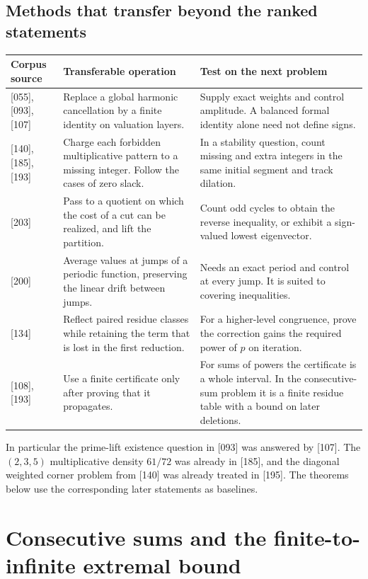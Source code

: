 \documentclass[11pt]{article}
\begin{document}
\subsection*{Methods that transfer beyond the ranked statements}
\begin{tabularx}{\linewidth}{@{}p{.23\linewidth} X X@{}}
\toprule
Corpus source & Transferable operation & Test on the next problem\\\midrule
{[055], [093], [107]} & Replace a global harmonic cancellation by a finite identity on valuation layers. & Supply exact weights and control amplitude. A balanced formal identity alone need not define signs.\\
{[140], [185], [193]} & Charge each forbidden multiplicative pattern to a missing integer. Follow the cases of zero slack. & In a stability question, count missing and extra integers in the same initial segment and track dilation.\\
{[203]} & Pass to a quotient on which the cost of a cut can be realized, and lift the partition. & Count odd cycles to obtain the reverse inequality, or exhibit a sign-valued lowest eigenvector.\\
{[200]} & Average values at jumps of a periodic function, preserving the linear drift between jumps. & Needs an exact period and control at every jump. It is suited to covering inequalities.\\
{[134]} & Reflect paired residue classes while retaining the term that is lost in the first reduction. & For a higher-level congruence, prove the correction gains the required power of $p$ on iteration.\\
{[108], [193]} & Use a finite certificate only after proving that it propagates. & For sums of powers the certificate is a whole interval. In the consecutive-sum problem it is a finite residue table with a bound on later deletions.\\
\bottomrule
\end{tabularx}
\par
In particular the prime-lift existence question in [093] was answered by [107]. The $(2,3,5)$ multiplicative density $61/72$ was already in [185], and the diagonal weighted corner problem from [140] was already treated in [195]. The theorems below use the corresponding later statements as baselines.

\clearpage

\section{Consecutive sums and the finite-to-infinite extremal bound}
\end{document}
